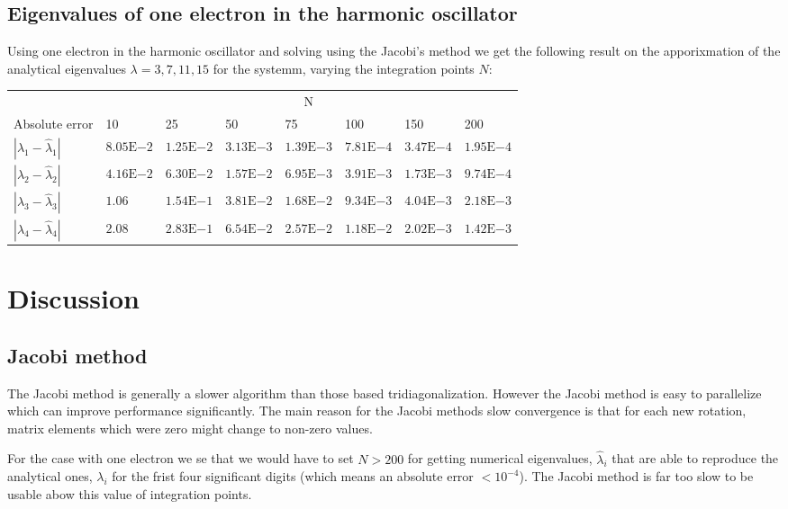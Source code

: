 \documentclass[a4paper, fontsize=11pt]{article}
\begin{document}
\subsection{Eigenvalues of one electron in the harmonic oscillator}

Using one electron in the harmonic oscillator and solving using the Jacobi's method we get the following result on the apporixmation of the analytical eigenvalues $\lambda = 3, 7, 11, 15$ for the systemm, varying the integration points $N$:

\begin{center}
\begin{tabular}{@{}llllllll@{}}
\toprule
     & \multicolumn{7}{c}{N}               \\ \cmidrule(l){2-8} 
Absolute error & 10 & 25 & 50 & 75 & 100 & 150 & 200 \\ \midrule
$|\lambda_1 - \hat{\lambda}_1|$    &    $8.05\mathrm{E}{-2}$&    $1.25\mathrm{E}{-2}$&    $3.13\mathrm{E}{-3}$&    $1.39\mathrm{E}{-3}$&     $7.81\mathrm{E}{-4}$&     $3.47\mathrm{E}{-4}$&      $1.95\mathrm{E}{-4}$\\
$|\lambda_2 - \hat{\lambda}_2|$    &    $4.16\mathrm{E}{-2}$&    $6.30\mathrm{E}{-2}$&    $1.57\mathrm{E}{-2}$&    $6.95\mathrm{E}{-3}$&     $3.91\mathrm{E}{-3}$&     $1.73\mathrm{E}{-3}$&      $9.74\mathrm{E}{-4}$\\
$|\lambda_3 - \hat{\lambda}_3|$    &    $1.06$&    $1.54\mathrm{E}{-1}$&    $3.81\mathrm{E}{-2}$&    $1.68\mathrm{E}{-2}$&     $9.34\mathrm{E}{-3}$&     $4.04\mathrm{E}{-3}$&     $2.18\mathrm{E}{-3}$\\
$|\lambda_4 - \hat{\lambda}_4|$    &    $2.08$&    $2.83\mathrm{E}{-1}$&    $6.54\mathrm{E}{-2}$&    $2.57\mathrm{E}{-2}$&     $1.18\mathrm{E}{-2}$&     $2.02\mathrm{E}{-3}$&     $1.42\mathrm{E}{-3}$\\ \bottomrule
\end{tabular}
\end{center}

\section{Discussion}
\subsection{Jacobi method}
The Jacobi method is generally a slower algorithm than those based tridiagonalization. However the Jacobi method is easy to parallelize which can improve performance significantly. The main reason for the Jacobi methods slow convergence is that for each new rotation, matrix elements which were zero might change to non-zero values.

For the case with one electron we se that we would have to set $N > 200$ for getting numerical eigenvalues, $\hat{\lambda}_i$ that are able to reproduce the analytical ones, $\lambda_i$ for the frist four significant digits (which means an absolute error $< 10^{-4}$). The Jacobi method is far too slow to be usable abow this value of integration points.



\end{document}
